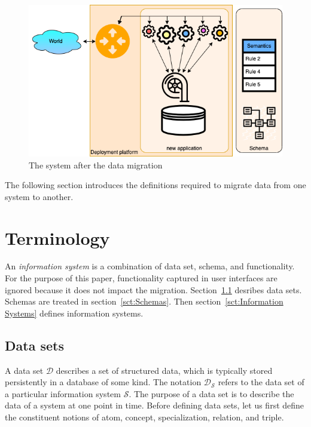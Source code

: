 \documentclass[runningheads]{llncs}
\newcommand{\dataset}{\mathscr{D}}
\newcommand{\infsys}{\mathscr{S}}
\begin{document}
\begin{figure}[bht]
   \begin{center}
     \includegraphics[scale=.35]{figures/datamigration-Post-migration.png}
   \end{center}
\caption{The system after the data migration}
\label{fig:post-migration}
\end{figure}

   The following section introduces the definitions required to migrate data from one system to another.

\section{Terminology}
\label{sct:Terminology}
   An {\em information system} is a combination of data set, schema, and functionality.
   For the purpose of this paper, functionality captured in user interfaces are ignored because it does not impact the migration.
   Section~\ref{sct:Data sets} desribes data sets. Schemas are treated in section~\ref{sct:Schemas}.
   Then section~\ref{sct:Information Systems} defines information systems.

\subsection{Data sets}
\label{sct:Data sets}
   A data set $\dataset$ describes a set of structured data, which is typically stored persistently in a database of some kind.
   The notation $\dataset_{\infsys}$ refers to the data set of a particular information system $\infsys$.
   The purpose of a data set is to describe the data of a system at one point in time. 
   Before defining data sets, let us first define the constituent notions of atom, concept, specialization, relation, and triple.
   
\end{document}
